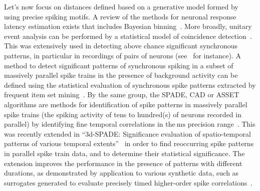 \documentclass[brainsci, %
               review,submit,pdftex,moreauthors%
               ]{Definitions/mdpi}
\newcommand{\ms}{\si{\milli\second}}%
\begin{document}
Let's now focus on distances defined based on a generative model formed by using precise spiking motifs. A review of the methods for neuronal response latency estimation exists that includes Bayesian binning~\citep{levakova_review_2015}. More broadly, unitary event analysis can be performed by a statistical model of coincidence detection~\citep{grun_unitary_2010}. This was extensively used in detecting above chance significant synchronous patterns, in particular in recordings of pairs of neurons (see~\citep{riehle_spike_1997} for instance). A method to detect significant patterns of synchronous spiking in a subset of massively parallel spike trains in the presence of background activity can be defined using the statistical evaluation of synchronous spike patterns extracted by frequent item set mining~\citep{torre_statistical_2013}. By the same group, the SPADE, CAD or ASSET algorithms are methods for identification of spike patterns in massively parallel spike trains (the spiking activity of tens to hundred(s) of neurons recorded in parallel) by identifying fine temporal correlations in the$~\ms$ precision range~\citep{quaglio_methods_2018}. This was recently extended in ``3d-SPADE: Significance evaluation of spatio-temporal patterns of various temporal extents''~\citep{stella_3d-spade_2019} in order to find reoccurring spike patterns in parallel spike train data, and to determine their statistical significance. The extension improves the performance in the presence of patterns with different durations, as demonstrated by application to various synthetic data, such as surrogates generated to evaluate precisely timed higher-order spike correlations~\citep{stella_comparing_2022}.
\end{document}

